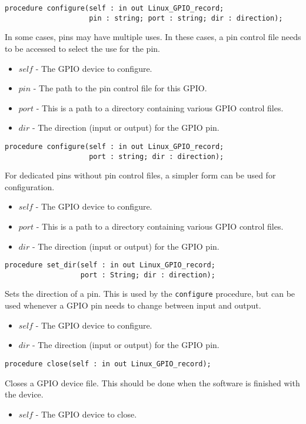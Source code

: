 \documentclass[10pt, openany]{book}
\newcommand{\indexfunc}[1]{\index[func]{#1}}
\newcommand{\function}[1]{\texttt{#1}}
\begin{document}
\begin{lstlisting}
procedure configure(self : in out Linux_GPIO_record;
                    pin : string; port : string; dir : direction);
\end{lstlisting}
\indexfunc{configure}
In some cases, pins may have multiple uses.  In these cases, a pin control file needs to be accessed to select the use for the pin.
\begin{itemize}
  \item $self$ - The GPIO device to configure.
  \item $pin$ - The path to the pin control file for this GPIO.
  \item $port$ - This is a path to a directory containing various GPIO control files.
  \item $dir$ - The direction (input or output) for the GPIO pin.
\end{itemize}

\begin{lstlisting}
procedure configure(self : in out Linux_GPIO_record;
                    port : string; dir : direction);
\end{lstlisting}
\indexfunc{configure}
For dedicated pins without pin control files, a simpler form can be used for configuration.
\begin{itemize}
  \item $self$ - The GPIO device to configure.
  \item $port$ - This is a path to a directory containing various GPIO control files.
  \item $dir$ - The direction (input or output) for the GPIO pin.
\end{itemize}

\begin{lstlisting}
procedure set_dir(self : in out Linux_GPIO_record;
                  port : String; dir : direction);
\end{lstlisting}
\indexfunc{set\_dir}
Sets the direction of a pin.  This is used by the \function{configure} procedure, but can be used whenever a GPIO pin needs to change between input and output.
\begin{itemize}
  \item $self$ - The GPIO device to configure.
  \item $dir$ - The direction (input or output) for the GPIO pin.
\end{itemize}

\begin{lstlisting}
procedure close(self : in out Linux_GPIO_record);
\end{lstlisting}
\indexfunc{close}
Closes a GPIO device file.  This should be done when the software is finished with the device.
\begin{itemize}
  \item $self$ - The GPIO device to close.
\end{itemize}
\end{document}
